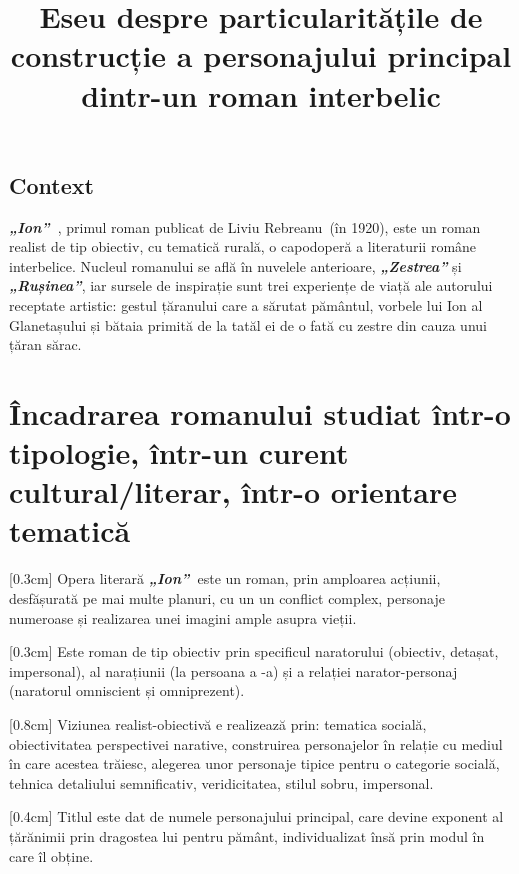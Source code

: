 \documentclass[
12pt,
a4paper
]{article}
\title{Eseu despre particularitățile de construcție a personajului principal dintr-un roman interbelic}
\date{}   %
\author{} %
\newcommand{\rom}[1]{\uppercase\expandafter{\romannumeral #1\relax}} %
\newcommand{\operatitle}{\textbf{\textit{„Ion”\ }}} %
\newcommand{\operaauthor}{Liviu Rebreanu\ } %
\begin{document}
\maketitle %



\subsection{Context}

\operatitle, primul roman publicat de \operaauthor (în 1920), este un roman realist de tip obiectiv, cu tematică rurală, o capodoperă a literaturii române interbelice. Nucleul romanului se află în nuvelele anterioare, \textbf{\textit{„Zestrea”}} și \textbf{\textit{„Rușinea”}}, iar sursele de inspirație sunt trei experiențe de viață ale autorului receptate artistic: gestul țăranului care a sărutat pământul, vorbele lui Ion al Glanetașului și bătaia primită de la tatăl ei de o fată cu zestre din cauza unui țăran sărac.

\section{Încadrarea romanului studiat într-o tipologie, într-un curent cultural/literar, într-o orientare tematică}

[0.3cm]
Opera literară \operatitle este un roman, prin amploarea acțiunii, desfășurată pe mai multe planuri, cu un un conflict complex, personaje numeroase și realizarea unei imagini ample asupra vieții.

[0.3cm]
Este roman de tip obiectiv prin specificul naratorului (obiectiv, detașat, impersonal), al narațiunii (la persoana a \rom{3}-a) și a relației narator-personaj (naratorul omniscient și omniprezent).

[0.8cm]
Viziunea realist-obiectivă e realizează prin: tematica socială, obiectivitatea perspectivei narative, construirea personajelor în relație cu mediul în care acestea trăiesc, alegerea unor personaje tipice pentru o categorie socială, tehnica detaliului semnificativ, veridicitatea, stilul sobru, impersonal.

[0.4cm]
Titlul este dat de numele personajului principal, care devine exponent al țărănimii prin dragostea lui pentru pământ, individualizat însă prin modul în care îl obține.
\end{document}
